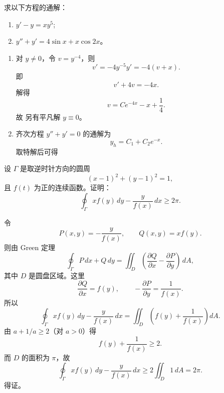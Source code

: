 \begin{question}[微分方程]

求以下方程的通解：
\begin{enumerate}[label=(\arabic*),leftmargin=2.6em,itemsep=0.25em,topsep=0.2em]
\item $y'-y=xy^5$;
\item $y''+y'=4\sin x+x\cos2x$。
\end{enumerate}

\begin{solution}

\begin{enumerate}[label=(\arabic*),leftmargin=2.6em,itemsep=0.25em,topsep=0.2em]
\item 对 $y\ne0$，令 $v=y^{-4}$，则
\[
 v'=-4y^{-5}y'=-4(v+x).
\]
即
\[
 v'+4v=-4x.
\]
解得
\[
 v=Ce^{-4x}-x+\frac14.
\]
故
另有平凡解 $y\equiv0$。

\item 齐次方程 $y''+y'=0$ 的通解为
\[
 y_h=C_1+C_2e^{-x}.
\]
取特解后可得
\end{enumerate}

\end{solution}
\end{question}

\begin{question}

设 $\Gamma$ 是取逆时针方向的圆周
\[
 (x-1)^2+(y-1)^2=1,
\]
且 $f(t)$ 为正的连续函数。证明：
\[
\oint_{\Gamma}x f(y)\,dy-\frac{y}{f(x)}\,dx\ge2\pi.
\]

\begin{solution}

令
\[
 P(x,y)=-\frac{y}{f(x)},\qquad Q(x,y)=xf(y).
\]
则由 Green 定理
\[
\oint_{\Gamma}P\,dx+Q\,dy
=\iint_D\left(\frac{\partial Q}{\partial x}-\frac{\partial P}{\partial y}\right)\,dA,
\]
其中 $D$ 是圆盘区域。这里
\[
 \frac{\partial Q}{\partial x}=f(y),
 \qquad
 -\frac{\partial P}{\partial y}=\frac{1}{f(x)}.
\]
所以
\[
\oint_{\Gamma}x f(y)\,dy-\frac{y}{f(x)}\,dx
=\iint_D\left(f(y)+\frac{1}{f(x)}\right)dA.
\]
由 $a+1/a\ge2$（对 $a>0$）得
\[
 f(y)+\frac{1}{f(x)}\ge2.
\]
而 $D$ 的面积为 $\pi$，故
\[
\oint_{\Gamma}x f(y)\,dy-\frac{y}{f(x)}\,dx
\ge2\iint_D1\,dA=2\pi.
\]
得证。


\end{solution}
\end{question}

